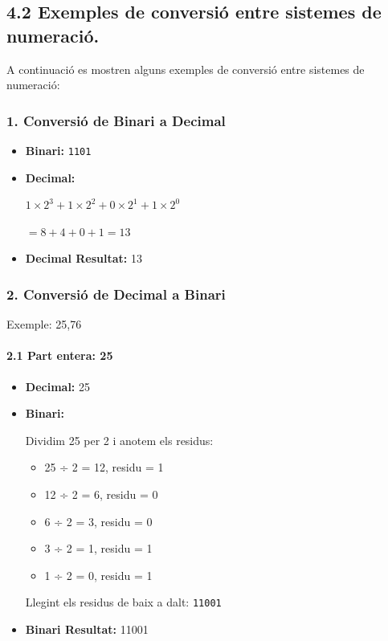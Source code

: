 \documentclass[
  12 pt,
  a4paper,
]{article}
\providecommand{\tightlist}{%
  \setlength{\itemsep}{0pt}\setlength{\parskip}{0pt}}
\begin{document}
\subsection{4.2 Exemples de conversió entre sistemes de
numeració.}\label{exemples-de-conversiuxf3-entre-sistemes-de-numeraciuxf3.}

A continuació es mostren alguns exemples de conversió entre sistemes de
numeració:

\subsubsection{1. Conversió de Binari a
Decimal}\label{conversiuxf3-de-binari-a-decimal}

\begin{itemize}
\item
  \textbf{Binari:} \texttt{1101}
\item
  \textbf{Decimal:}

  \(1 \times 2^3 + 1 \times 2^2 + 0 \times 2^1 + 1 \times 2^0\)

  \(= 8 + 4 + 0 + 1 = 13\)
\item
  \textbf{Decimal Resultat:} 13
\end{itemize}

\subsubsection{2. Conversió de Decimal a
Binari}\label{conversiuxf3-de-decimal-a-binari}

Exemple: 25,76

\paragraph{2.1 Part entera: 25}\label{part-entera-25}

\begin{itemize}
\item
  \textbf{Decimal:} 25
\item
  \textbf{Binari:}

  Dividim 25 per 2 i anotem els residus:

  \begin{itemize}
  \tightlist
  \item
    25 ÷ 2 = 12, residu = 1
  \item
    12 ÷ 2 = 6, residu = 0
  \item
    6 ÷ 2 = 3, residu = 0
  \item
    3 ÷ 2 = 1, residu = 1
  \item
    1 ÷ 2 = 0, residu = 1
  \end{itemize}

  Llegint els residus de baix a dalt: \texttt{11001}
\item
  \textbf{Binari Resultat:} 11001
\end{itemize}
\end{document}
